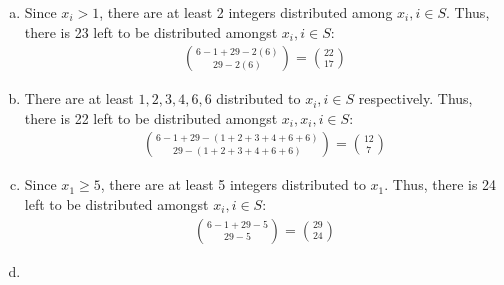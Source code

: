 \documentclass[article,12pt]{article}
\begin{document}
\begin{enumerate}[a)]
    \item 
    Since $x_i > 1$, there are at least 2 integers distributed among $x_i, i \in S$. Thus, there is 23 left to be distributed amongst $x_i, i \in S$:
    \begin{align*}
        \binom{6-1+29-2(6)}{29-2(6)} = \binom{22}{17}
    \end{align*}
    \item 
    There are at least $1,2,3,4,6,6$ distributed to $x_i, i \in S$ respectively. Thus, there is 22 left to be distributed amongst $x_i, x_i, i \in S$:
    \begin{align*}
        \binom{6-1+29-(1+2+3+4+6+6)}{29-(1+2+3+4+6+6)} = \binom{12}{7}
    \end{align*}
    \item
    Since $x_1 \geq 5$, there are at least 5 integers distributed to $x_1$. Thus, there is 24 left to be distributed amongst $x_i, i \in S$: 
    \begin{align*}
        \binom{6-1+29-5}{29-5} = \binom{29}{24}
    \end{align*}
    \item 

\end{enumerate}
\end{document}
